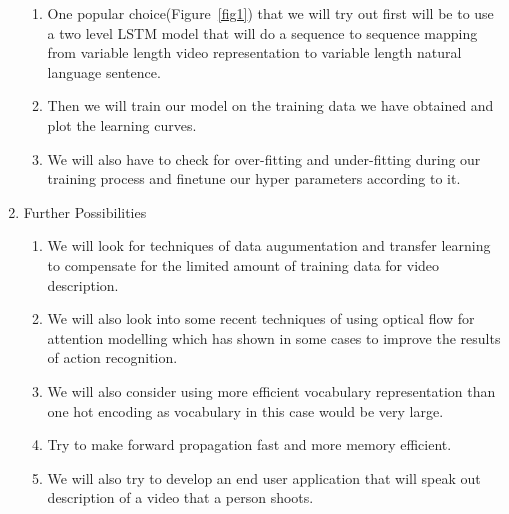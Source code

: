\documentclass{article}
\begin{document}
\begin{enumerate}
\begin{enumerate}
				\item
					One popular choice(Figure~\ref{fig1}) that we will try out first will be to use a two level LSTM model that will do a sequence to sequence mapping from variable length video representation to variable length natural language sentence.
				\item
					Then we will train our model on the training data we have obtained and plot the learning curves.
				\item
					We will also have to check for over-fitting and under-fitting during our training process and finetune our hyper parameters according to it.
			\end{enumerate}
			\item Further Possibilities
			\begin{enumerate}
				\item We will look for techniques of data augumentation and transfer learning to compensate for the limited amount of training data for video description.
				\item We will also look into some recent techniques of using optical flow for attention modelling which has shown in some cases to improve the results of action recognition.
				\item We will also consider using more efficient vocabulary representation than one hot encoding as vocabulary in this case would be very large.
				\item Try to make forward propagation fast and more memory efficient.
				\item We will also try to develop an end user application that will speak out description of a video that a person shoots.
			\end{enumerate}
		\end{enumerate}
\end{document}
